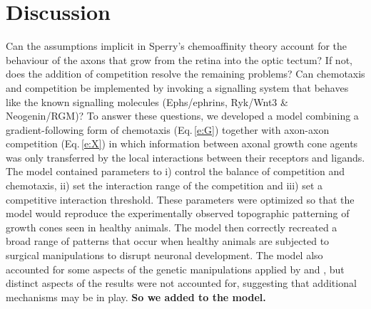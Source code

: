 \documentclass[11pt, a4paper]{article}
\begin{document}



\section{Discussion}


Can the assumptions implicit in Sperry's chemoaffinity theory account for the behaviour of the axons that grow from the retina into the optic tectum?
If not, does the addition of competition resolve the remaining problems?
Can chemotaxis and competition be implemented by invoking a signalling system that behaves like the known signalling molecules (Ephs/ephrins, Ryk/Wnt3 \& Neogenin/RGM)?
To answer these questions, we developed a model combining a gradient-following form of chemotaxis (Eq.\,\ref{e:G}) together with axon-axon competition (Eq.\,\ref{e:X}) in which information between axonal growth cone agents was only transferred by the local interactions between their receptors and ligands.
The model contained parameters to i) control the balance of competition and chemotaxis, ii) set the interaction range of the competition and iii) set a competitive interaction threshold.
These parameters were optimized so that the model would reproduce the experimentally observed topographic patterning of growth cones seen in healthy animals.
The model then correctly recreated a broad range of patterns that occur when healthy animals are subjected to surgical manipulations to disrupt neuronal development.
The model also accounted for some aspects of the genetic manipulations applied by \citet{brown_topographic_2000} and \citet{reber_relative_2004}, but distinct aspects of the results were not accounted for, suggesting that additional mechanisms may be in play. \textbf{So we added to the model.}

\end{document}

